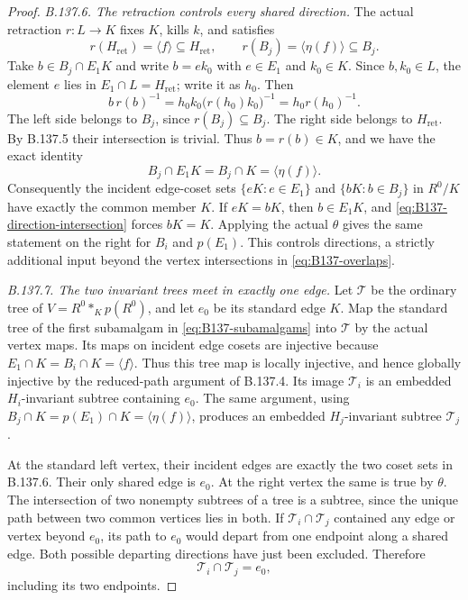 \begin{proof}
\emph{B.137.6. The retraction controls every shared direction.}
The actual retraction $r:L\to K$ fixes $K$, kills $k$, and satisfies
\[
 r(H_{\mathrm{ret}})=\langle f\rangle\subseteq H_{\mathrm{ret}},
 \qquad r(B_j)=\langle\eta(f)\rangle\subseteq B_j.
\]
Take $b\in B_j\cap E_1K$ and write $b=e k_0$ with $e\in E_1$
and $k_0\in K$. Since $b,k_0\in L$, the element $e$ lies in
$E_1\cap L=H_{\mathrm{ret}}$; write it as $h_0$. Then
\[
 b\,r(b)^{-1}
   =h_0k_0\bigl(r(h_0)k_0\bigr)^{-1}
   =h_0r(h_0)^{-1}.
\]
The left side belongs to $B_j$, since $r(B_j)\subseteq B_j$.
The right side belongs to $H_{\mathrm{ret}}$.
By B.137.5 their intersection is trivial. Thus $b=r(b)\in K$,
and we have the exact identity
\begin{equation}\label{eq:B137-direction-intersection}
 B_j\cap E_1K=B_j\cap K=\langle\eta(f)\rangle.
\end{equation}
Consequently the incident edge-coset sets
$\{eK:e\in E_1\}$ and $\{bK:b\in B_j\}$ in $R^0/K$
have exactly the common member $K$. If $eK=bK$, then
$b\in E_1K$, and \eqref{eq:B137-direction-intersection}
forces $bK=K$. Applying the actual $\theta$ gives the same
statement on the right for $B_i$ and $p(E_1)$.
This controls directions, a strictly additional input beyond
the vertex intersections in \eqref{eq:B137-overlaps}.

\emph{B.137.7. The two invariant trees meet in exactly one edge.}
Let $\mathcal T$ be the ordinary tree of
$V=R^0*_{K}p(R^0)$, and let $e_0$ be its standard edge $K$.
Map the standard tree of the first subamalgam in
\eqref{eq:B137-subamalgams} into $\mathcal T$ by the actual
vertex maps. Its maps on incident edge cosets are injective
because $E_1\cap K=B_i\cap K=\langle f\rangle$.
Thus this tree map is locally injective, and hence globally
injective by the reduced-path argument of B.137.4.
Its image $\mathcal T_i$ is an embedded $H_i$-invariant
subtree containing $e_0$. The same argument, using
$B_j\cap K=p(E_1)\cap K=\langle\eta(f)\rangle$, produces
an embedded $H_j$-invariant subtree $\mathcal T_j$.

At the standard left vertex, their incident edges are
exactly the two coset sets in B.137.6. Their only shared
edge is $e_0$. At the right vertex the same is true by
$\theta$. The intersection of two nonempty subtrees of a
tree is a subtree, since the unique path between two common
vertices lies in both. If $\mathcal T_i\cap\mathcal T_j$
contained any edge or vertex beyond $e_0$, its path to
$e_0$ would depart from one endpoint along a shared edge.
Both possible departing directions have just been excluded.
Therefore
\[
 \mathcal T_i\cap\mathcal T_j=e_0,
\]
including its two endpoints.


\end{proof}
